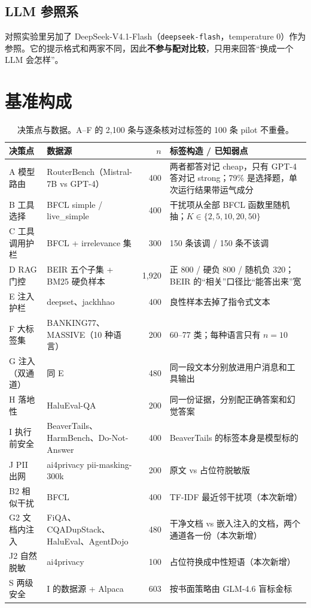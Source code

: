 \documentclass[UTF8,fontset=none,zihao=-4]{ctexart}
\begin{document}
\subsection{LLM 参照系}
对照实验里另加了 DeepSeek-V4.1-Flash（\texttt{deepseek-flash}，temperature 0）作为参照。它的提示格式和两家不同，因此\textbf{不参与配对比较}，只用来回答“换成一个 LLM 会怎样”。

\section{基准构成}
\begin{table}[h]
\centering\small
\begin{tabular}{@{}p{3.2cm}p{4.6cm}rp{5.4cm}@{}}
\toprule
决策点 & 数据源 & $n$ & 标签构造 / 已知弱点\\
\midrule
A 模型路由 & RouterBench（Mistral-7B vs GPT-4） & 400 & 两者都答对记 cheap，只有 GPT-4 答对记 strong；79\% 是选择题，单次运行结果带运气成分\\
B 工具选择 & BFCL simple / live\_simple & 400 & 干扰项从全部 BFCL 函数里随机抽；$K\in\{2,5,10,20,50\}$\\
C 工具调用护栏 & BFCL + irrelevance 集 & 300 & 150 条该调 / 150 条不该调\\
D RAG 门控 & BEIR 五个子集 + BM25 硬负样本 & 1{,}920 & 正 800 / 硬负 800 / 随机负 320；BEIR 的“相关”口径比“能答出来”宽\\
E 注入护栏 & deepset、jackhhao & 400 & 良性样本去掉了指令式文本\\
F 大标签集 & BANKING77、MASSIVE（10 种语言） & 200 & 60--77 类；每种语言只有 $n{=}10$\\
G 注入（双通道） & 同 E & 480 & 同一段文本分别放进用户消息和工具输出\\
H 落地性 & HaluEval-QA & 200 & 同一份证据，分别配正确答案和幻觉答案\\
I 执行前安全 & BeaverTails、HarmBench、Do-Not-Answer & 400 & BeaverTails 的标签本身是模型标的\\
J PII 出网 & ai4privacy pii-masking-300k & 200 & 原文 vs 占位符脱敏版\\
\midrule
B2 相似干扰 & BFCL & 400 & TF-IDF 最近邻干扰项（本次新增）\\
G2 文档内注入 & FiQA、CQADupStack、HaluEval、AgentDojo & 480 & 干净文档 vs 嵌入注入的文档，两个通道各一份（本次新增）\\
J2 自然脱敏 & ai4privacy & 100 & 占位符换成中性短语（本次新增）\\
S 两级安全 & I 的数据源 + Alpaca & 603 & 按书面策略由 GLM-4.6 盲标金标\\
\bottomrule
\end{tabular}
\caption{决策点与数据。A--F 的 2{,}100 条与逐条核对过标签的 100 条 pilot 不重叠。}
\end{table}
\end{document}
